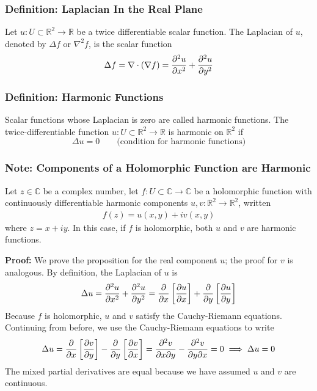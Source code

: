 \documentclass[11pt, a4paper]{article}
\renewcommand{\div}{\nabla \cdot}
\renewcommand{\grad}{\nabla}
\newcommand{\R}{\mathbb{R}} %
\newcommand{\C}{\mathbb{C}} %
\begin{document}
\subsubsection{Definition: Laplacian In the Real Plane}
Let $ u : U \subset \mathbb{R}^2 \to \mathbb{R} $ be a twice differentiable scalar function. The Laplacian of $ u $, denoted by $ \Delta f $ or $ \nabla^2 f $, is the scalar function
\begin{equation*}
	\Delta f = \div{(\grad{f})} = \pdv[2]{u}{x} + \pdv[2]{u}{y}
\end{equation*}

\subsubsection{Definition: Harmonic Functions}
Scalar functions whose Laplacian is zero are called harmonic functions. The twice-differentiable function $ u : U \subset \mathbb{R}^2 \to \mathbb{R} $ is harmonic on $ \R^2 $ if
\begin{equation*}
	\Delta u = 0 \qquad \text{(condition for harmonic functions)}
\end{equation*}

\subsubsection{Note: Components of a Holomorphic Function are Harmonic}
Let $ z \in \C $ be a complex number, let $ f: U \subset \C \to \C $ be a holomorphic function with continuously differentiable harmonic components $ u, v: \R^2 \to \R^2 $, written
\begin{align*}
	f(z) = u(x, y) + iv(x, y)
\end{align*}
where $ z = x + iy $. In this case, if $ f $ is holomorphic, both $ u $ and $ v $ are harmonic functions.

\textbf{Proof:} We prove the proposition for the real component $ u $; the proof for $ v $ is analogous. By definition, the Laplacian of $ u $ is
\begin{align*}
	\Delta u = \pdv[2]{u}{x} + \pdv[2]{u}{y} = \pdv{}{x}\left[\pdv{u}{x} \right] + \pdv{}{y}\left[\pdv{u}{y} \right]
\end{align*}
Because $ f $ is holomorphic, $ u $ and $ v $ satisfy the Cauchy-Riemann equations. Continuing from before, we use the Cauchy-Riemann equations to write
\begin{align*}
	\Delta u = \pdv{}{x}\left[\pdv{v}{y} \right] - \pdv{}{y}\left[\pdv{v}{x} \right] = \dfrac{\partial^2 v}{\partial x \partial y} - \dfrac{\partial^2 v}{\partial y \partial x} = 0 \implies \Delta u = 0
\end{align*}
The mixed partial derivatives are equal because we have assumed $ u $ and $ v $ are continuous.
\end{document}
